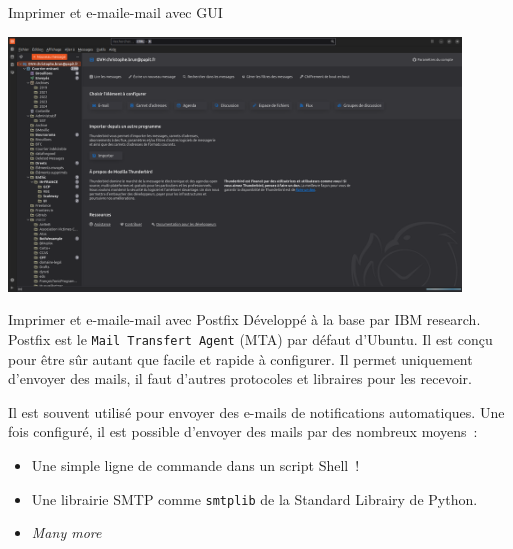 \documentclass{beamer}
\begin{document}
    \begin{frame}{Imprimer et e-mail}{e-mail avec GUI}
        \begin{center}
            \includegraphics[width=12cm]{image/thunderbird}
        \end{center}
    \end{frame}

    \begin{frame}{Imprimer et e-mail}{e-mail avec Postfix}
        Développé à la base par IBM research.
        \bigbreak
        Postfix est le \lstinline{Mail Transfert Agent} (MTA) par défaut d'Ubuntu.
        Il est conçu pour être sûr autant que facile et rapide à configurer.
        Il permet uniquement d'envoyer des mails, il faut d'autres protocoles et libraires pour les recevoir.

        Il est souvent utilisé pour envoyer des e-mails de notifications automatiques.
        \bigbreak
        Une fois configuré, il est possible d'envoyer des mails par des nombreux moyens~:
        \begin{itemize}
            \item Une simple ligne de commande dans un script Shell~!
            \item Une librairie SMTP comme \lstinline{smtplib} de la Standard Librairy de Python.
            \item \textit{Many more}
        \end{itemize}
    \end{frame}
\end{document}
